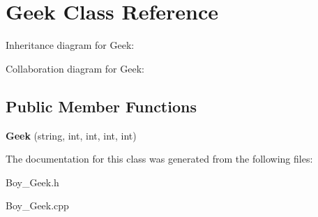 \hypertarget{classGeek}{}\section{Geek Class Reference}
\label{classGeek}


Inheritance diagram for Geek\+:


Collaboration diagram for Geek\+:
\subsection*{Public Member Functions}
\begin{DoxyCompactItemize}
\item 
{\bfseries Geek} (string, int, int, int, int)\hypertarget{classGeek_a22085b8a32e3166f08ea266d11dcbdfb}{}\label{classGeek_a22085b8a32e3166f08ea266d11dcbdfb}

\end{DoxyCompactItemize}


The documentation for this class was generated from the following files\+:\begin{DoxyCompactItemize}
\item 
Boy\+\_\+\+Geek.\+h\item 
Boy\+\_\+\+Geek.\+cpp\end{DoxyCompactItemize}
